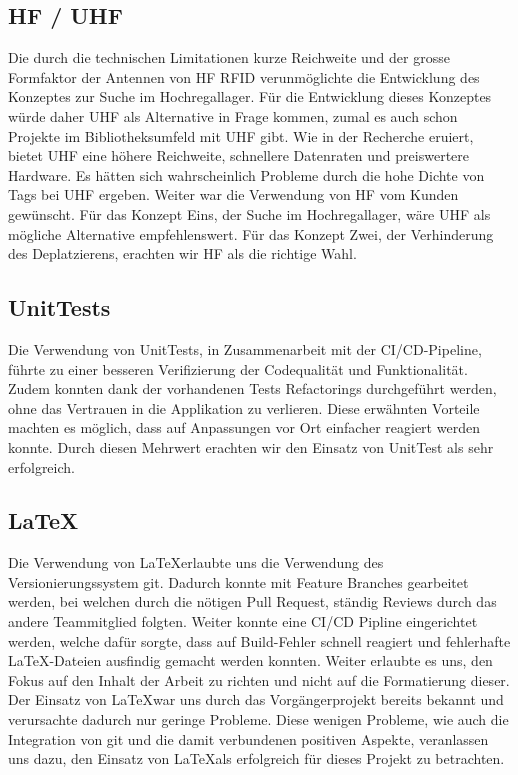 \subsection{HF / UHF}
Die durch die technischen Limitationen kurze Reichweite und der grosse Formfaktor der Antennen von \gls{HF} \gls{RFID} verunmöglichte die Entwicklung des Konzeptes zur Suche im Hochregallager. Für die Entwicklung dieses Konzeptes würde daher \gls{UHF} als Alternative in Frage kommen, zumal es auch schon Projekte im Bibliotheksumfeld mit \gls{UHF} gibt. Wie in der Recherche eruiert, bietet \gls{UHF} eine höhere Reichweite, schnellere Datenraten und preiswertere Hardware. Es hätten sich wahrscheinlich Probleme durch die hohe Dichte von Tags bei \gls{UHF} ergeben. Weiter war die Verwendung von \gls{HF} vom Kunden gewünscht. Für das Konzept Eins, der Suche im Hochregallager, wäre \gls{UHF} als mögliche Alternative empfehlenswert. Für das Konzept Zwei, der Verhinderung des Deplatzierens, erachten wir \gls{HF} als die richtige Wahl.

\subsection{UnitTests}
Die Verwendung von UnitTests, in Zusammenarbeit mit der CI/CD-Pipeline, führte zu einer besseren Verifizierung der Codequalität und Funktionalität. Zudem konnten dank der vorhandenen Tests Refactorings durchgeführt werden, ohne das Vertrauen in die Applikation zu verlieren. Diese erwähnten Vorteile machten es möglich, dass auf Anpassungen vor Ort einfacher reagiert werden konnte. Durch diesen Mehrwert erachten wir den Einsatz von UnitTest als sehr erfolgreich.

\subsection{\LaTeX}
Die Verwendung von \LaTeX erlaubte uns die Verwendung des Versionierungssystem git. Dadurch konnte mit Feature Branches gearbeitet werden, bei welchen durch die nötigen Pull Request, ständig Reviews durch das andere Teammitglied folgten. Weiter konnte eine CI/CD Pipline eingerichtet werden, welche dafür sorgte, dass auf Build-Fehler schnell reagiert und fehlerhafte \LaTeX-Dateien ausfindig gemacht werden konnten. Weiter erlaubte es uns, den Fokus auf den Inhalt der Arbeit zu richten und nicht auf die Formatierung dieser. Der Einsatz von \LaTeX war uns durch das Vorgängerprojekt bereits bekannt und verursachte dadurch nur geringe Probleme. Diese wenigen Probleme, wie auch die Integration von git und die damit verbundenen positiven Aspekte, veranlassen uns dazu, den Einsatz von \LaTeX als erfolgreich für dieses Projekt zu betrachten.


